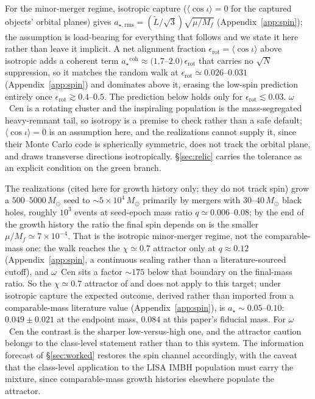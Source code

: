 \documentclass[11pt]{article}
\newcommand{\msun}{\ensuremath{M_\odot}}
\newcommand{\astar}{\ensuremath{a_\star}}
\newcommand{\ocen}{\ensuremath{\omega}~Cen}
\begin{document}
For the minor-merger regime, isotropic capture ($\langle\cos\iota\rangle = 0$ for the captured objects' orbital planes) gives $a_{\star,\mathrm{rms}} = (\tilde L/\sqrt3)\sqrt{\mu/M_f}$ (Appendix~\ref{app:spin}); the assumption is load-bearing for everything that follows and we state it here rather than leave it implicit. A net alignment fraction $\epsilon_{\mathrm{rot}} = \langle\cos\iota\rangle$ above isotropic adds a coherent term $\astar^{\mathrm{coh}} \approx (1.7$--$2.0)\,\epsilon_{\mathrm{rot}}$ that carries no $\sqrt N$ suppression, so it matches the random walk at $\epsilon_{\mathrm{rot}} \simeq 0.026$--$0.031$ (Appendix~\ref{app:spin}) and dominates above it, erasing the low-spin prediction entirely once $\epsilon_{\mathrm{rot}} \gtrsim 0.4$--$0.5$. The prediction below holds only for $\epsilon_{\mathrm{rot}} \lesssim 0.03$. \ocen{} is a rotating cluster and the inspiraling population is the mass-segregated heavy-remnant tail, so isotropy is a premise to check rather than a safe default; $\langle\cos\iota\rangle = 0$ is an assumption here, and the \citet{GonzalezPrieto2025} realizations cannot supply it, since their Monte Carlo code is spherically symmetric, does not track the orbital plane, and draws transverse directions isotropically. \S\ref{sec:relic} carries the tolerance as an explicit condition on the green branch.

The \citet{GonzalezPrieto2025} realizations (cited here for growth history only; they do not track spin) grow a $500$--$5000\,\msun$ seed to $\sim 5\times10^{4}\,\msun$ primarily by mergers with $30$--$40\,\msun$ black holes, roughly $10^{3}$ events at seed-epoch mass ratio $q \simeq 0.006$--$0.08$; by the end of the growth history the ratio the final spin depends on is the smaller $\mu/M_f \simeq 7\times10^{-4}$. That is the isotropic minor-merger regime, not the comparable-mass one: the walk reaches the $\chi \simeq 0.7$ attractor only at $q \approx 0.12$ (Appendix~\ref{app:spin}, a continuous scaling rather than a literature-sourced cutoff), and \ocen{} sits a factor $\sim 175$ below that boundary on the final-mass ratio. So the $\chi \simeq 0.7$ attractor of \citet{Fishbach2017} and \citet{GerosaBerti2017} does not apply to this target; under isotropic capture the expected outcome, derived rather than imported from a comparable-mass literature value (Appendix~\ref{app:spin}), is $\astar \sim 0.05$--$0.10$: $0.049 \pm 0.021$ at the \citet{GonzalezPrieto2025} endpoint mass, $0.084$ at this paper's fiducial mass. For \ocen{} the contrast is the sharper low-versus-high one, and the attractor caution belongs to the class-level statement rather than to this system. The information forecast of \S\ref{sec:worked} restores the spin channel accordingly, with the caveat that the class-level application to the LISA IMBH population must carry the mixture, since comparable-mass growth histories elsewhere populate the attractor.
\end{document}
